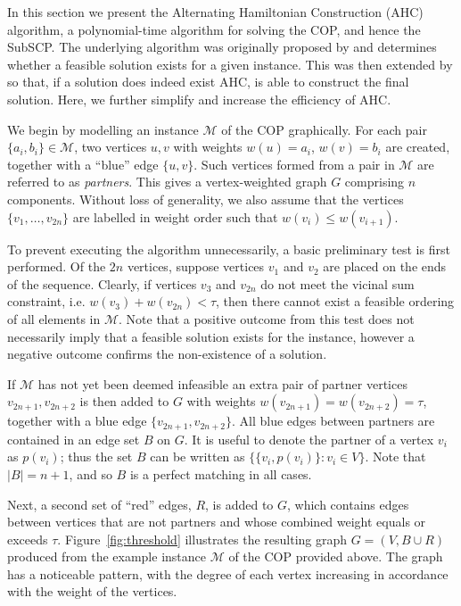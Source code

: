 \documentclass[authoryear]{elsarticle}
\begin{document}
In this section we present the Alternating Hamiltonian Construction (AHC) algorithm, a polynomial-time algorithm for solving the COP, and hence the SubSCP. The underlying algorithm was originally proposed by \citet{becker2010} and determines whether a feasible solution exists for a given instance. This was then extended by \citet{hawa2018} so that, if a solution does indeed exist AHC, is able to construct the final solution. Here, we further simplify and increase the efficiency of AHC.


We begin by modelling an instance $\mathcal{M}$ of the COP graphically. For each pair $\{a_i, b_i\} \in \mathcal{M}$, two vertices $u, v$ with weights $w(u) = a_i$, $w(v) = b_i$ are created, together with a ``blue'' edge $\{u, v\}$. Such vertices formed from a pair in $\mathcal{M}$ are referred to as \textit{partners}. This gives a vertex-weighted graph $G$ comprising $n$ components. Without loss of generality, we also assume that the vertices $\{v_1,\dotsc,v_{2n}\}$ are labelled in weight order such that $w(v_i) \leq w(v_{i+1})$.

To prevent executing the algorithm unnecessarily, a basic preliminary test is first performed. Of the $2n$ vertices, suppose vertices $v_1$ and $v_2$ are placed on the ends of the sequence. Clearly, if vertices $v_3$ and $v_{2n}$ do not meet the vicinal sum constraint, i.e. $w(v_3) + w(v_{2n}) < \tau$, then there cannot exist a feasible ordering of all elements in $\mathcal{M}$. Note that a positive outcome from this test does not necessarily imply that a feasible solution exists for the instance, however a negative outcome confirms the non-existence of a solution.

If $\mathcal{M}$ has not yet been deemed infeasible an extra pair of partner vertices $v_{2n+1}, v_{2n+2}$ is then added to $G$ with weights $w(v_{2n+1}) = w(v_{2n+2}) = \tau$, together with a blue edge $\{v_{2n+1}, v_{2n+2}\}$. All blue edges between partners are contained in an edge set $B$ on $G$. It is useful to denote the partner of a vertex $v_i$ as $p(v_i)$; thus the set $B$ can be written as $\{\{v_i, p(v_i)\} : v_i \in V\}$. Note that $|B| = n+1$, and so $B$ is a perfect matching in all cases. 

Next, a second set of ``red'' edges, $R$, is added to $G$, which contains edges between vertices that are not partners and whose combined weight equals or exceeds $\tau$. Figure~\ref{fig:threshold} illustrates the resulting graph $G = (V, B \cup R)$ produced from the example instance $\mathcal{M}$ of the COP provided above. The graph has a noticeable pattern, with the degree of each vertex increasing in accordance with the weight of the vertices. 
\end{document}
